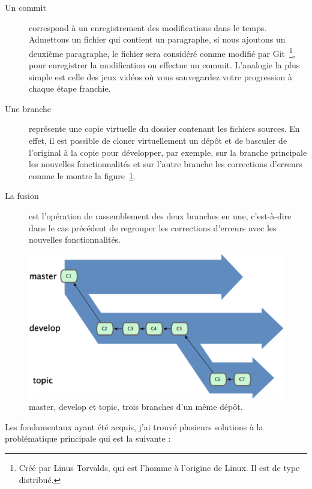 \begin{description}
    \item[Un commit] correspond à un enregistrement des modifications
    dans le temps. Admettons un fichier qui contient un paragraphe, si nous
    ajoutons un deuxième paragraphe, le fichier sera considéré comme modifié
    par Git\, \footnote{Créé par Linus Torvalds, qui est l'homme à l'origine
    de Linux. Il est de type distribué.}, pour enregistrer la modification
    on effectue un commit. L'analogie la plus simple est celle des jeux
    vidéos où vous sauvegardez votre progression à chaque étape franchie.
    \item[Une branche] représente une \og copie virtuelle \fg{} du dossier
    contenant les fichiers sources. En effet, il est possible de cloner
    virtuellement un dépôt et de basculer de l'original à la copie pour
    développer, par exemple, sur la branche principale les nouvelles
    fonctionnalités et sur l'autre branche les corrections d'erreurs comme
    le montre la figure~\ref{branches}.  \item[La fusion] est l'opération de
    rassemblement des deux branches en une, c'est-à-dire dans le cas
    précédent de regrouper les corrections d'erreurs avec les nouvelles
    fonctionnalités.
\end{description}

\begin{figure}[h]
\begin{center}
\includegraphics[scale=1]{images/branches.png}
\caption{master, develop et topic, trois branches d'un même dépôt.}
\label{branches}
\end{center}
\end{figure}

Les fondamentaux ayant été acquis, j'ai trouvé plusieurs solutions à la
problématique principale qui est la suivante :

